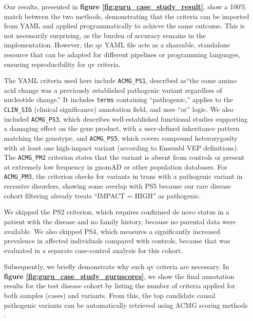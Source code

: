 Our results, presented in \textbf{figure \ref{fig:guru_case_study_result}}, show a 100\% match between the two methods, demonstrating that the criteria can be imported from YAML and applied programmatically to achieve the same outcome. This is not necessarily surprising, as the burden of accuracy remains in the implementation. However, the \ac{qc} YAML file acts as a shareable, standalone resource that can be adapted for different pipelines or programming languages, ensuring reproducibility for \ac{qv} criteria.

The YAML criteria used here include \texttt{ACMG\_PS1}, described as``the same amino acid change was a previously established pathogenic variant regardless of nucleotide change.'' It includes \texttt{terms} containing ``pathogenic,'' applies to the \texttt{CLIN\_SIG} (clinical significance) annotation field, and uses ``or'' logic. We also included \texttt{ACMG\_PS3}, which describes well-established functional studies supporting a damaging effect on the gene product, with a user-defined inheritance pattern matching the genotype, and \texttt{ACMG\_PS5}, which covers compound heterozygosity with at least one high-impact variant (according to Ensembl VEP definitions). The \texttt{ACMG\_PM2} criterion states that the variant is absent from controls or present at extremely low frequency in gnomAD or other population databases. For \texttt{ACMG\_PM3}, the criterion checks for variants in trans with a pathogenic variant in recessive disorders, showing some overlap with PS5 because our rare disease cohort filtering already treats ``IMPACT = HIGH'' as pathogenic.

We skipped the PS2 criterion, which requires confirmed de novo status in a patient with the disease and no family history, because no parental data were available. We also skipped PS4, which measures a significantly increased prevalence in affected individuals compared with controls, because that was evaluated in a separate case-control analysis for this cohort.

Subsequently, we briefly demonstrate why such \ac{qv} criteria are necessary. In \textbf{figure \ref{fig:guru_case_study_guruscores}}, we show the final annotation results for the test disease cohort by listing the number of criteria applied for both samples (cases) and variants. From this, the top candidate causal pathogenic variants can be automatically retrieved using ACMG scoring methods \cite{richards2015standards, tavtigian2020fitting}.

